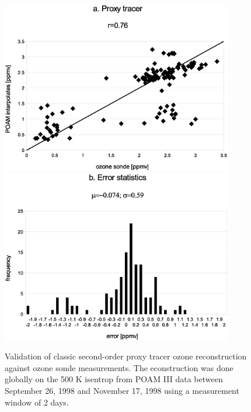 \begin{figure}
  \centering
  \includegraphics[width=0.9\textwidth]{global_classic_sonde_scatter}
  \includegraphics[width=0.9\textwidth]{global_classic_sonde_error}
  \caption{Validation of classic second-order proxy tracer ozone reconstruction against ozone sonde measurements. The econstruction was done globally on the 500 K isentrop from POAM III data between September 26, 1998 and November 17, 1998 using a measurement window of 2 days.}
  \label{global_classic_sonde}
\end{figure}

